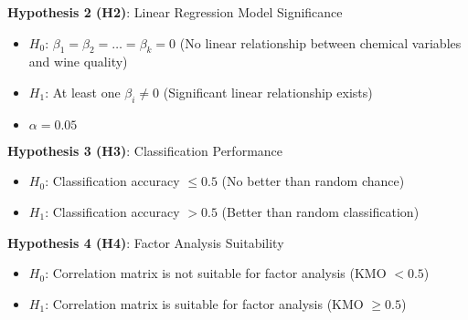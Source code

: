 \textbf{Hypothesis 2 (H2)}: Linear Regression Model Significance
\begin{itemize}
	\item $H_0$: $\beta_1 = \beta_2 = \ldots = \beta_k = 0$ (No linear relationship between chemical variables and wine quality)
	\item $H_1$: At least one $\beta_i \neq 0$ (Significant linear relationship exists)
	\item $\alpha = 0.05$
\end{itemize}

\textbf{Hypothesis 3 (H3)}: Classification Performance
\begin{itemize}
	\item $H_0$: Classification accuracy $\leq 0.5$ (No better than random chance)
	\item $H_1$: Classification accuracy $> 0.5$ (Better than random classification)
\end{itemize}

\textbf{Hypothesis 4 (H4)}: Factor Analysis Suitability
\begin{itemize}
	\item $H_0$: Correlation matrix is not suitable for factor analysis (KMO $< 0.5$)
	\item $H_1$: Correlation matrix is suitable for factor analysis (KMO $\geq 0.5$)
\end{itemize}